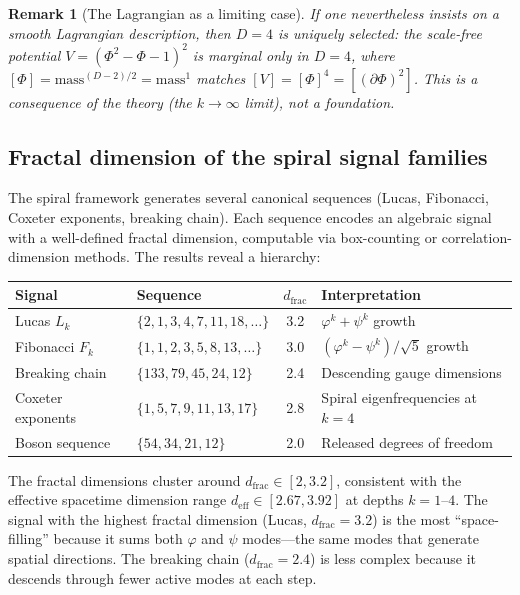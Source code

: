 \documentclass[12pt,a4paper]{article}
\newtheorem{remark}[theorem]{Remark}
\begin{document}
\begin{remark}[The Lagrangian as a limiting case]
\label{rem:lagrangian}
If one \emph{nevertheless} insists on a smooth Lagrangian description, then $D=4$ is uniquely selected: the scale-free potential $V = (\Phi^2 - \Phi - 1)^2$ is marginal only in $D=4$, where $[\Phi] = \mathrm{mass}^{(D-2)/2} = \mathrm{mass}^1$ matches $[V] = [\Phi]^4 = [(\partial\Phi)^2]$. This is a \emph{consequence} of the theory (the $k \to \infty$ limit), not a foundation.
\end{remark}

\subsection{Fractal dimension of the spiral signal families}
\label{sec:fractal-dim}

The spiral framework generates several canonical sequences (Lucas, Fibonacci, Coxeter exponents, breaking chain). Each sequence encodes an algebraic signal with a well-defined fractal dimension, computable via box-counting or correlation-dimension methods. The results reveal a hierarchy:

\begin{center}
\begin{tabular}{|l|l|c|l|}
\hline
\textbf{Signal} & \textbf{Sequence} & \textbf{$d_{\text{frac}}$} & \textbf{Interpretation} \\
\hline
Lucas $L_k$ & $\{2, 1, 3, 4, 7, 11, 18, \ldots\}$ & 3.2 & $\varphi^k + \psi^k$ growth \\
Fibonacci $F_k$ & $\{1, 1, 2, 3, 5, 8, 13, \ldots\}$ & 3.0 & $(\varphi^k - \psi^k)/\sqrt{5}$ growth \\
Breaking chain & $\{133, 79, 45, 24, 12\}$ & 2.4 & Descending gauge dimensions \\
Coxeter exponents & $\{1, 5, 7, 9, 11, 13, 17\}$ & 2.8 & Spiral eigenfrequencies at $k = 4$ \\
Boson sequence & $\{54, 34, 21, 12\}$ & 2.0 & Released degrees of freedom \\
\hline
\end{tabular}
\end{center}
The fractal dimensions cluster around $d_{\text{frac}} \in [2, 3.2]$, consistent with the effective spacetime dimension range $d_{\mathrm{eff}} \in [2.67, 3.92]$ at depths $k = 1$--$4$. The signal with the highest fractal dimension (Lucas, $d_{\text{frac}} = 3.2$) is the most ``space-filling'' because it sums both $\varphi$ and $\psi$ modes---the same modes that generate spatial directions. The breaking chain ($d_{\text{frac}} = 2.4$) is less complex because it descends through fewer active modes at each step.
\end{document}
